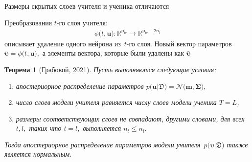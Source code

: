 \documentclass[10pt,pdf,hyperref={unicode}]{beamer}
\newtheorem{rustheorem}{Теорема}
\begin{document}
\begin{frame}{Размеры скрытых слоев учителя и ученика отличаются}

Преобразования $t$-го слоя учителя:
\[
\begin{aligned}
\phi\bigr(t, \mathbf{u}\bigr) : \mathbb{R}^{\text{p}_{\text{tr}}} \to \mathbb{R}^{\text{p}_{\text{tr}}-2n_t}
\end{aligned}
\]
описывает удаление одного нейрона из~$t$-го слоя. Новый вектор параметров $\bm{\upsilon} =  \phi\bigr(t, \mathbf{u}\bigr),$ а элементы вектора, которые были удалены как $\bar{\bm{\upsilon}}$

\begin{rustheorem}[Грабовой, 2021]
Пусть выполняются следующие условия:
\begin{enumerate}[1)]
\item апостериорное распределение параметров $p\bigr(\mathbf{u}|\mathfrak{D}\bigr) = \mathcal{N}\bigr(\mathbf{m}, \bm{\Sigma}\bigr),$
\item число слоев модели учителя равняется числу слоев модели ученика $T=L$,
\item размеры соответствующих слоев не совпадают, другими словами, для всех $t, l,$ таких что $t=l,$ выполняется $n_t \leq n_l.$
\end{enumerate}
Тогда апостериорное распределение параметров модели учителя~$p\bigr(\bm{\upsilon}|\mathfrak{D}\bigr)$ также является нормальным.
\end{rustheorem}

\end{frame}
\end{document}
